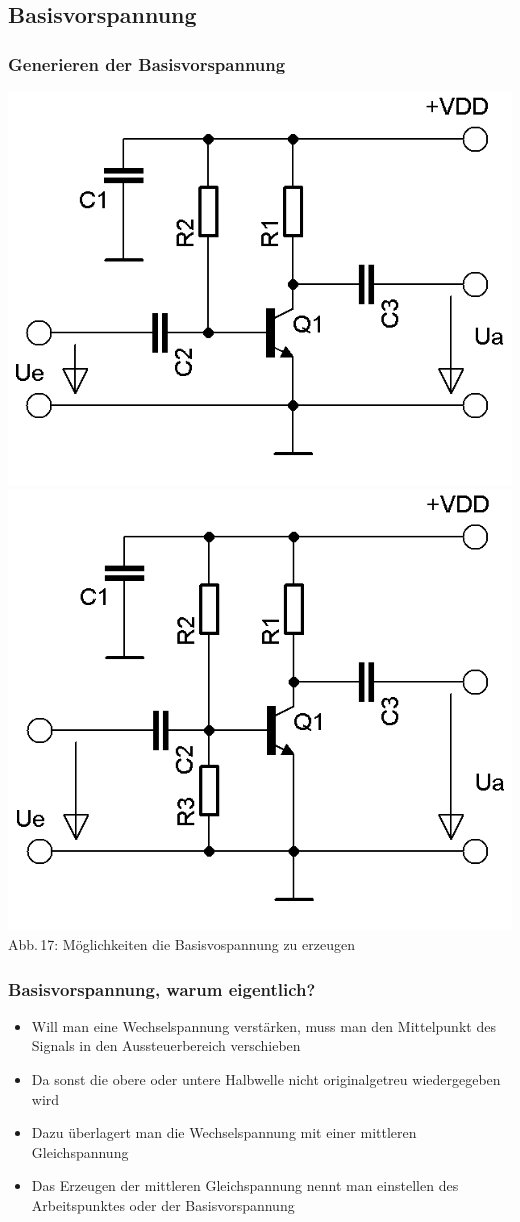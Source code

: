 \subsection*{Basisvorspannung}
\begin{frame}
  \frametitle{Generieren der Basisvorspannung}
  \begin{center}
    \includegraphics[width=.4\textwidth,height=.85\textheight,keepaspectratio]{a06/Transistor-Verstaerker.png}
    \vspace{3mm}
    \includegraphics[width=.4\textwidth,height=.85\textheight,keepaspectratio]{a06/Transistor-Verstaerker-C.png}\\
    {\tiny Abb.\,17: Möglichkeiten die Basisvospannung zu erzeugen}
  \end{center}
\end{frame}

\begin{frame}
  \frametitle{Basisvorspannung, warum eigentlich?}
  \begin{itemize}
    \item Will man eine Wechselspannung verstärken, muss man den Mittelpunkt des Signals in den Aussteuerbereich verschieben
    \item Da sonst die obere oder untere Halbwelle nicht originalgetreu wiedergegeben wird
    \item Dazu überlagert man die Wechselspannung mit einer mittleren Gleichspannung
    \item Das Erzeugen der mittleren Gleichspannung nennt man einstellen des Arbeitspunktes oder der Basisvorspannung
  \end{itemize}
\end{frame}

